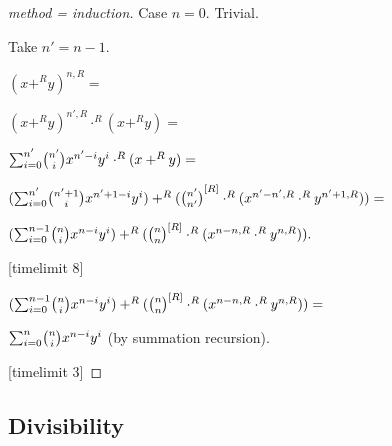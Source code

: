 \documentclass[english,11pt]{article}
\begin{document}
\begin{forthel}
\begin{proof}[method = induction]
Case $n = 0$. Trivial.

Take $n' = n-1$.

$(x +^{R} y)^{n,R} =$

$(x +^{R} y)^{n',R} \cdot^{R} (x +^{R} y) =$

$\binsum{n'}{n'}{x}{y}{R} \cdot^{R} (x +^{R} y) =$

$(\binsum{n'}{n'+1}{x}{y}{R}) +^{R} (\cho{n'}{n'}^{[R]} \cdot^{R} (x^{n'-n',R} \cdot^{R} y^{n'+1,R})) =$

$(\binsum{n-1}{n}{x}{y}{R}) +^{R} (\cho{n}{n}^{[R]} \cdot^{R} (x^{n-n,R} \cdot^{R} y^{n,R})).$

[timelimit 8]


$(\binsum{n-1}{n}{x}{y}{R}) +^{R} (\cho{n}{n}^{[R]} \cdot^{R} (x^{n-n,R} \cdot^{R} y^{n,R})) =$

$\binsum{n}{n}{x}{y}{R}$ (by summation recursion).

[timelimit 3]

\end{proof}

\end{forthel}

\subsection{Divisibility} 
\end{document}
